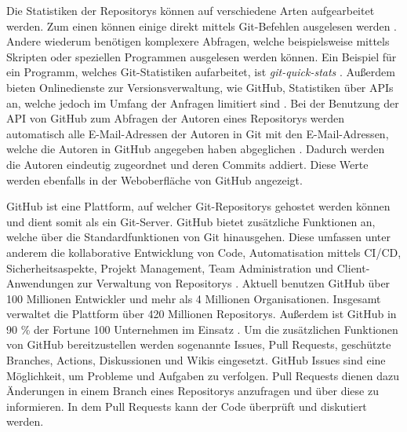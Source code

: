 Die Statistiken der Repositorys können auf verschiedene Arten aufgearbeitet werden.
Zum einen können einige direkt mittels Git-Befehlen ausgelesen werden \autocite{chacon_git_2024}.
Andere wiederum benötigen komplexere Abfragen, welche beispielsweise mittels Skripten oder speziellen Programmen ausgelesen werden können.
Ein Beispiel für ein Programm, welches Git-Statistiken aufarbeitet, ist \emph{git-quick-stats} \autocite{mestan_git-quick-stats_2024}.
Außerdem bieten Onlinedienste zur Versionsverwaltung, wie GitHub, Statistiken über APIs an, welche jedoch im Umfang der Anfragen limitiert sind \autocite{github_rate_2022}.
Bei der Benutzung der API von GitHub zum Abfragen der Autoren eines Repositorys werden automatisch alle E-Mail-Adressen der Autoren in Git mit den E-Mail-Adressen, welche die Autoren in GitHub angegeben haben abgeglichen \autocite{github_rest-api-endpunkte_2022}.
Dadurch werden die Autoren eindeutig zugeordnet und deren Commits addiert.
Diese Werte werden ebenfalls in der Weboberfläche von GitHub angezeigt.

GitHub ist eine Plattform, auf welcher Git-Repositorys gehostet werden können und dient somit als ein Git-Server.
GitHub bietet zusätzliche Funktionen an, welche über die Standardfunktionen von Git hinausgehen.
Diese umfassen unter anderem die kollaborative Entwicklung von Code, Automatisation mittels CI/CD, Sicherheitsaspekte, Projekt Management, Team Administration und Client-Anwendungen zur Verwaltung von Repositorys \autocite{ponuthorai_version_2022}.
Aktuell benutzen GitHub über 100 Millionen Entwickler und mehr als 4 Millionen Organisationen.
Insgesamt verwaltet die Plattform über 420 Millionen Repositorys.
Außerdem ist GitHub in 90 \% der Fortune 100 Unternehmen im Einsatz \autocite{github_about_2024}.
Um die zusätzlichen Funktionen von GitHub bereitzustellen werden sogenannte Issues, Pull Requests, geschützte Branches, Actions, Diskussionen und Wikis eingesetzt.
GitHub Issues sind eine Möglichkeit, um Probleme und Aufgaben zu verfolgen.
Pull Requests dienen dazu Änderungen in einem Branch eines Repositorys anzufragen und über diese zu informieren.
In dem Pull Requests kann der Code überprüft und diskutiert werden.
